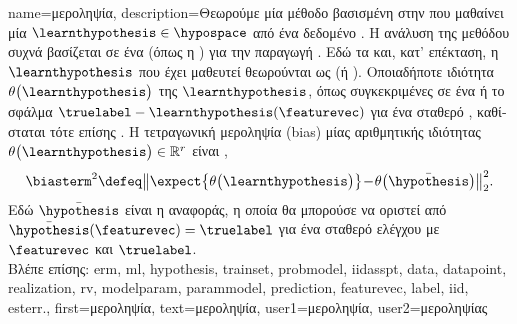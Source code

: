 {name={\foreignlanguage{greek}{μεροληψία}},
	description={\foreignlanguage{greek}{Θεωρούμε μία μέθοδο} 
		 \foreignlanguage{greek}{βασισμένη στην}  \foreignlanguage{greek}{που μαθαίνει μία} 
		 $\learnthypothesis \in \hypospace$ \foreignlanguage{greek}{από ένα δεδομένο} . 
		\foreignlanguage{greek}{Η ανάλυση της μεθόδου}  \foreignlanguage{greek}{συχνά βασίζεται σε ένα} 
		 (\foreignlanguage{greek}{όπως η} ) \foreignlanguage{greek}{για την 
		παραγωγή} . \foreignlanguage{greek}{Εδώ τα}  \foreignlanguage{greek}{και, 
		κατ' επέκταση, η}  $\learnthypothesis$ \foreignlanguage{greek}{που έχει μαθευτεί θεωρούνται ως} 
		 (\foreignlanguage{greek}{ή}  ). \foreignlanguage{greek}{Οποιαδήποτε 
		ιδιότητα $\theta\big(\learnthypothesis\big)$ της $\learnthypothesis$, όπως συγκεκριμένες}  
		\foreignlanguage{greek}{σε ένα}  \foreignlanguage{greek}{ή το σφάλμα}  
		$\truelabel - \learnthypothesis(\featurevec)$ \foreignlanguage{greek}{για ένα σταθερό} , 
		\foreignlanguage{greek}{καθίσταται τότε επίσης} . \foreignlanguage{greek}{Η τετραγωνική μεροληψία}
		(bias) \foreignlanguage{greek}{μίας αριθμητικής ιδιότητας $\theta\big(\learnthypothesis\big) \in \mathbb{R}^{r}$ είναι}
		\cite{BishopBook}, \cite{hastie01statisticallearning}
		$$\biasterm^{2} \defeq \big\| \expect \big\{ \theta\big(\learnthypothesis\big) \big\}\!-\!\theta\big(\bar{\hypothesis}\big)  \big\|_{2}^{2}.$$
		\foreignlanguage{greek}{Εδώ $\bar{\hypothesis}$ είναι η}  \foreignlanguage{greek}{αναφοράς, η οποία  
		θα μπορούσε να οριστεί από $\bar{\hypothesis}(\featurevec)=\truelabel$ για ένα σταθερό}  
		\foreignlanguage{greek}{ελέγχου με}  $\featurevec$ \foreignlanguage{greek}{και}  $\truelabel$. 
		\\
		\foreignlanguage{greek}{Βλέπε επίσης:} \gls{erm}, \gls{ml}, \gls{hypothesis}, \gls{trainset}, \gls{probmodel}, \gls{iidasspt}, \gls{data}, 
		\gls{datapoint}, \gls{realization}, \gls{rv}, \gls{modelparam}, \gls{parammodel}, \gls{prediction}, \gls{featurevec}, \gls{label}, \gls{iid}, 
		\gls{esterr}.},
	first={\foreignlanguage{greek}{μεροληψία}},
	text={\foreignlanguage{greek}{μεροληψία}},
	user1={\foreignlanguage{greek}{μεροληψία}}, %
	user2={\foreignlanguage{greek}{μεροληψίας}} %
}

